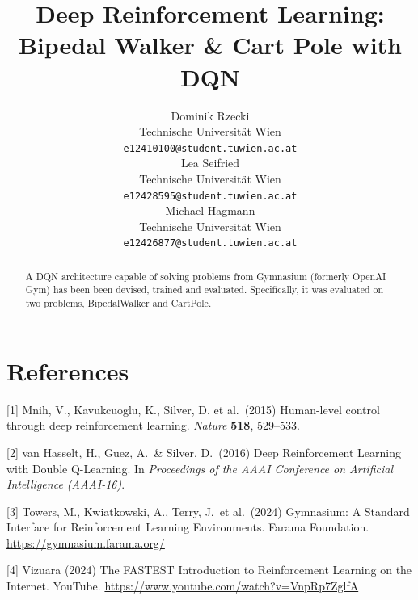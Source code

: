 \documentclass{article}
\title{Deep Reinforcement Learning: Bipedal Walker \& Cart Pole with DQN}
\author{%
  Dominik Rzecki \\
  Technische Universität Wien \\
  \texttt{e12410100@student.tuwien.ac.at} \\
  \And
  Lea Seifried \\
  Technische Universität Wien \\
  \texttt{e12428595@student.tuwien.ac.at} \\
  \And
  Michael Hagmann \\
  Technische Universität Wien \\
  \texttt{e12426877@student.tuwien.ac.at} \\
}
\begin{document}
\maketitle


\begin{abstract}
  A DQN architecture capable of solving problems from Gymnasium (formerly OpenAI Gym) has been been devised, trained and evaluated.
  Specifically, it was evaluated on two problems, BipedalWalker and CartPole. 

\end{abstract}






\clearpage
\appendix


\section*{References}
\medskip

{
\small

[1] Mnih, V., Kavukcuoglu, K., Silver, D. et al.\ (2015) Human-level control through deep reinforcement learning. {\it Nature} {\bf 518}, 529--533.

[2] van Hasselt, H., Guez, A.\ \& Silver, D.\ (2016) Deep Reinforcement Learning with Double Q-Learning. In {\it Proceedings of the AAAI Conference on Artificial Intelligence (AAAI-16)}.

[3] Towers, M., Kwiatkowski, A., Terry, J.\ et al.\ (2024) Gymnasium: A Standard Interface for Reinforcement Learning Environments. Farama Foundation. \url{https://gymnasium.farama.org/}

[4] Vizuara (2024) The FASTEST Introduction to Reinforcement Learning on the Internet. YouTube. \url{https://www.youtube.com/watch?v=VnpRp7ZglfA}
}



\newpage

\end{document}
